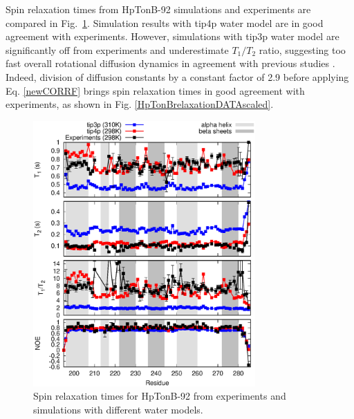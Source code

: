 \documentclass[pre,aps,floatfix,authordate1-4,twocolumn]{revtex4-1}
\begin{document}
Spin relaxation times from HpTonB-92 simulations and experiments are
compared in Fig.~\ref{HpTonBrelaxationDATA}. Simulation results with
tip4p water model are in good agreement with experiments.
However, simulations with tip3p water model are significantly
off from experiments and underestimate $T_1/T_2$ ratio, suggesting too
fast overall rotational diffusion dynamics \cite{carper97} 
in agreement with previous studies \cite{wong08}. Indeed, division
of diffusion constants by a constant factor of 2.9 before applying
Eq. \ref{newCORRF} brings spin relaxation times in good agreement with experiments,
as shown in Fig. \ref{HpTonBrelaxationDATAscaled}.
\begin{figure}[!h]
  \includegraphics[width=8.5cm]{../Figs/HpTonBrelaxationDATA.eps}%
  \caption{Spin relaxation times for HpTonB-92 from experiments \cite{??}
    and simulations with different water models.
    \label{HpTonBrelaxationDATA}}%
\end{figure}
\end{document}

